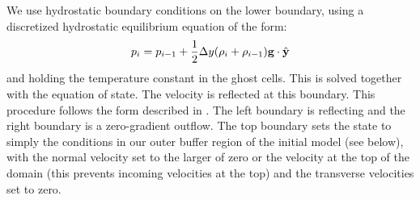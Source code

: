 \documentclass[preprint,times,tighten]{aastex63}
\newcommand{\gb}{{\bf{g}}}
\begin{document}
We use hydrostatic boundary conditions on the lower boundary, using
a discretized hydrostatic equilibrium equation of the form:
\begin{equation}
\label{eq:hse}
    p_i = p_{i-1} + \frac{1}{2} \Delta y (\rho_i + \rho_{i-1}) \gb \cdot \hat{\bf y}
\end{equation}
and holding the temperature constant in the ghost cells.  This is solved
together with the equation of state.  The velocity is reflected at this boundary.
This procedure follows the form described in \citet{ppm-hse}.  The
left boundary is reflecting and the right boundary is a zero-gradient
outflow.  The top boundary sets the state to simply the conditions
in our outer buffer region of the initial model (see below), with the
normal velocity set to the larger of zero or the velocity at the top
of the domain (this prevents incoming velocities at the top) and the
transverse velocities set to zero.
\end{document}
